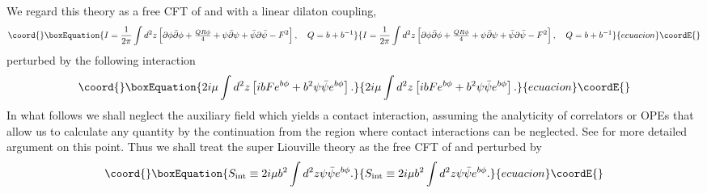 \documentclass[a4paper,12pt]{article}
\providecommand{\tfrac}[2]{{\textstyle\frac{#1}{#2}}}
\begin{document}
   We regard this theory as a free CFT of \myHighlight{$\phi$}\coordHE{} and \myHighlight{$\psi$}\coordHE{} with
 a linear dilaton coupling,
\begin{equation}\coord{}\boxEquation{
  I = \frac{1}{2\pi}\int d^2z\left[
       \partial\phi\bar{\partial}\phi+\tfrac{QR\phi}{4}
      +\psi\bar{\partial}\psi+\bar{\psi}\partial\bar{\psi}-F^2
      \right],~~~
      Q=b+b^{-1}
}{
  I = \frac{1}{2\pi}\int d^2z\left[
       \partial\phi\bar{\partial}\phi+\tfrac{QR\phi}{4}
      +\psi\bar{\partial}\psi+\bar{\psi}\partial\bar{\psi}-F^2
      \right],~~~
      Q=b+b^{-1}
}{ecuacion}\coordE{}\end{equation}
 perturbed by the following interaction
\begin{equation}\coord{}\boxEquation{
   2i\mu\int d^2z
   \left[ibFe^{b\phi}+b^2\psi\bar{\psi}e^{b\phi}\right].
}{
   2i\mu\int d^2z
   \left[ibFe^{b\phi}+b^2\psi\bar{\psi}e^{b\phi}\right].
}{ecuacion}\coordE{}\end{equation}
 In what follows we shall neglect the auxiliary field \coordHE{} which
 yields a contact interaction, assuming the analyticity of correlators
 or OPEs that allow us to calculate any quantity by the continuation
 from the region where contact interactions can be neglected.
 See \cite{GS, DS, dFK} for more detailed argument on this point.
 Thus we shall treat the super Liouville theory as the free CFT
 of \myHighlight{$\phi$}\coordHE{} and \myHighlight{$\psi$}\coordHE{} perturbed by
\begin{equation}\coord{}\boxEquation{
  S_{\rm int} \equiv 2i\mu b^2\int d^2z \psi\bar{\psi}e^{b\phi}.
}{
  S_{\rm int} \equiv 2i\mu b^2\int d^2z \psi\bar{\psi}e^{b\phi}.
}{ecuacion}\coordE{}\end{equation}
\end{document}

